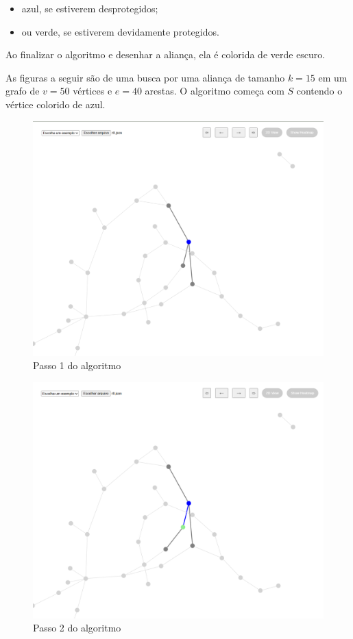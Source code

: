 \begin{itemize}
  \item azul, se estiverem desprotegidos;
  \item ou verde, se estiverem devidamente protegidos.
\end{itemize}

Ao finalizar o algoritmo e desenhar a aliança, ela é colorida de verde escuro.

As figuras a seguir são de uma busca por uma aliança de tamanho $k = 15$ em um grafo de $v=50$ vértices e $e=40$ arestas. O algoritmo começa com $S$ contendo o vértice colorido de azul.

\begin{figure}[!htb]
\centering
\includegraphics[width=12cm]{GrafoSteps1.png}
\caption{Passo 1 do algoritmo}
\label{fig:grafo-steps-1}
\end{figure}

\begin{figure}[!htb]
\centering
\includegraphics[width=12cm]{GrafoSteps2.png}
\caption{Passo 2 do algoritmo}
\label{fig:grafo-steps-2}
\end{figure}

